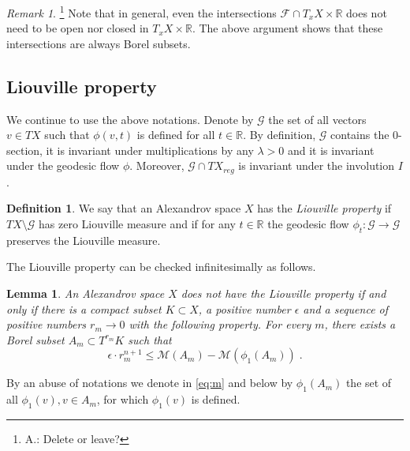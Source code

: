 \documentclass[12pt,leqno]{amsart}
\numberwithin{equation}{section}
\newtheorem{lem}[thm]{Lemma}
\theoremstyle{definition}
\newtheorem{defn}[thm]{Definition}%
\theoremstyle{remark}
\newtheorem{rem}[thm]{Remark}
\newcommand{\R}{\mathbb{R}}
\def\:{\colon}
\begin{document}
\begin{rem}  \footnote{A.: Delete or leave? }
Note that in general, even the intersections $\mathcal F\cap T_xX \times \R$ does not need to be open nor closed in $T_xX \times \R$.
The above argument shows that these intersections are always Borel subsets.
\end{rem}






\subsection{Liouville property}
We continue to use the above notations.
 Denote by $\mathcal G$ the set of all vectors $v\in TX $ such that $\phi (v,t)$ is defined for all $t\in \R$. By definition, $\mathcal G$ contains the $0$-section, it
 is invariant under multiplications by any $\lambda >0$  and it is invariant under the geodesic flow $\phi$. Moreover, $\mathcal G\cap TX_{reg}$ is invariant under the involution $I$.
  \begin{defn}
 We say that an Alexandrov space $X$ has the \emph{Liouville property} if  $TX\setminus \mathcal G$ has zero Liouville measure  and if
for any $t\in \R$ the geodesic flow $\phi _t \:\mathcal G\to \mathcal G$ preserves the Liouville measure.
 \end{defn}

The Liouville property can be checked infinitesimally as follows.

\begin{lem} \label{infini}
An Alexandrov space $X$ does not have the Liouville property if and only if there is a compact subset $K\subset X$, a positive number
$\epsilon$ and a sequence of positive numbers  $r_m \to 0$  with the following property.
 For every  $m$, there exists a Borel subset $A_m\subset T^{r_ m} K$ such that
 \begin{equation} \label{eq:m}
\epsilon \cdot r_m^{n +1} \leq \mathcal M (A_m) -\mathcal M (\phi _1 (A_m)) \;.
\end{equation}
\end{lem}
By an abuse of notations we denote in \eqref{eq:m}  and below by  $\phi_1 (A_m)$ the set of all $\phi _1(v), v\in A_m$, for which
$\phi _1(v)$ is defined.
\end{document}
